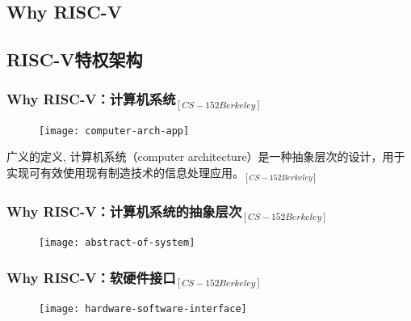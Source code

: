 \subsection{Why RISC-V} %
\subsection{RISC-V特权架构}


\begin{frame}
	
	\frametitle{Why RISC-V：\small{计算机系统$_{[CS-152 Berkeley]}$}}
	
	\begin{figure}
		\centering
		\texttt{[image: computer-arch-app]}
	\end{figure}
	\pause
	
	广义的定义, 计算机系统（computer architecture）是一种抽象层次的设计，用于实现可有效使用现有制造技术的信息处理应用。$_{[CS-152 Berkeley]}$
\end{frame}


\begin{frame}
	
	\frametitle{Why RISC-V：\small{计算机系统的抽象层次$ _{[CS-152 Berkeley]} $}}
	
	\begin{figure}
		\centering
		\texttt{[image: abstract-of-system]}
	\end{figure}

\end{frame}


\begin{frame}[plain]
	
	\frametitle{Why RISC-V：\small{软硬件接口$ _{[CS-152 Berkeley]} $}}
	\begin{figure}
		\centering
		\texttt{[image: hardware-software-interface]}
	\end{figure}
	

\end{frame}

